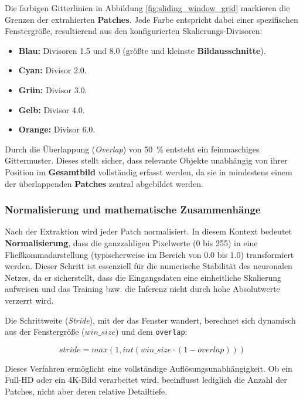 \documentclass[
    a4paper,        %
    11pt,           %
    ngerman,        %
    parskip=half,   %
    listof=totoc,   %
    bibliography=totoc %
]{scrartcl}
\begin{document}
Die farbigen Gitterlinien in Abbildung \ref{fig:sliding_window_grid} markieren die Grenzen der extrahierten \textbf{Patches}. Jede Farbe entspricht dabei einer spezifischen Fenstergröße, resultierend aus den konfigurierten Skalierungs-Divisoren:

\begin{itemize}
    \item \textbf{Blau:} Divisoren \num{1,5} und \num{8,0} (größte und kleinste \textbf{Bildausschnitte}).
    \item \textbf{Cyan:} Divisor \num{2,0}.
    \item \textbf{Grün:} Divisor \num{3,0}.
    \item \textbf{Gelb:} Divisor \num{4,0}.
    \item \textbf{Orange:} Divisor \num{6,0}.
\end{itemize}

Durch die Überlappung (\textit{Overlap}) von \SI{50}{\percent} entsteht ein feinmaschiges Gittermuster. Dieses stellt sicher, dass relevante Objekte unabhängig von ihrer Position im \textbf{Gesamtbild} vollständig erfasst werden, da sie in mindestens einem der überlappenden \textbf{Patches} zentral abgebildet werden.

\subsubsection{Normalisierung und mathematische Zusammenhänge}

Nach der Extraktion wird jeder Patch normalisiert. In diesem Kontext bedeutet \textbf{Normalisierung}, dass die ganzzahligen Pixelwerte (0 bis 255) in eine Fließkommadarstellung (typischerweise im Bereich von 0.0 bis 1.0) transformiert werden. Dieser Schritt ist essenziell für die numerische Stabilität des neuronalen Netzes, da er sicherstellt, dass die Eingangsdaten eine einheitliche Skalierung aufweisen und das Training bzw. die Inferenz nicht durch hohe Absolutwerte verzerrt wird.

Die Schrittweite (\textit{Stride}), mit der das Fenster wandert, berechnet sich dynamisch aus der Fenstergröße ($win\_size$) und dem \texttt{overlap}:

$$ stride = max(1, int(win\_size \cdot (1 - overlap))) $$

Dieses Verfahren ermöglicht eine vollständige Auflösungsunabhängigkeit. Ob ein Full-HD oder ein 4K-Bild verarbeitet wird, beeinflusst lediglich die Anzahl der Patches, nicht aber deren relative Detailtiefe.
\end{document}
